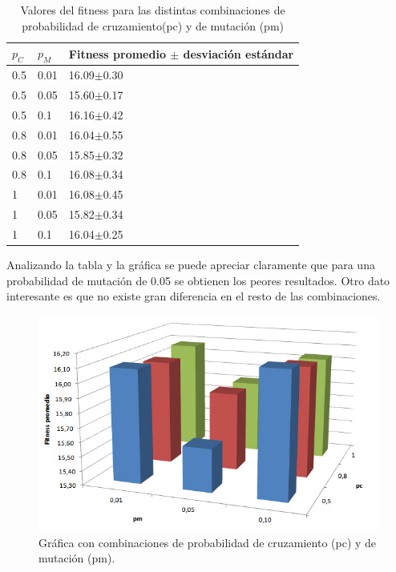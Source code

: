  \begin{table}[H]
 	\renewcommand{\arraystretch}{1.2}
 	\caption{Valores del fitness para las distintas combinaciones de probabilidad de cruzamiento(pc) y de mutación (pm)}
 	\label{table:parametro_mutacion_cruzamiento}
 	\centering
 	\begin{tabular}{p{1cm}p{1cm}p{3.5cm} }
 		\hline
 		$p_C$& 
 		$p_M$ & 
 		Fitness promedio  $\pm$ desviación estándar\\ 
 		\hline
 		0.5 & 0.01  &  16.09$\pm$0.30\\
 		0.5 & 0.05 &  15.60$\pm$0.17\\
 		0.5 & 0.1  &  16.16$\pm$0.42\\
 		0.8 & 0.01  &  16.04$\pm$0.55\\
 		0.8 & 0.05  &  15.85$\pm$0.32\\
 		0.8 & 0.1  &  16.08$\pm$0.34\\
 		1 & 0.01 &  16.08$\pm$0.45\\
 		1 & 0.05 &  15.82$\pm$0.34\\
 		1 & 0.1 &  16.04$\pm$0.25\\
 		\hline
 	\end{tabular}
 \end{table}
 
Analizando la tabla y la gráfica se puede apreciar claramente que para una probabilidad de mutación de 0.05 se obtienen los peores resultados. Otro dato interesante es que no existe gran diferencia en el resto de las combinaciones.

\begin{figure}[H]
	\centering
	\includegraphics[width=0.8\linewidth]{Figures/grafica_mutacion_cruzamiento}
	\caption[Gráfica con combinaciones de probabilidad de cruzamiento y de mutación.]{Gráfica con combinaciones de probabilidad de cruzamiento (pc) y de mutación (pm).}
	\label{fig:grafica_mutacion_cruzamiento}
\end{figure}


